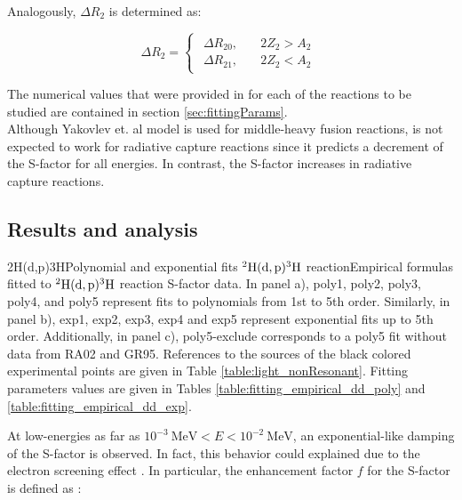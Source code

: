 \documentclass[openany]{book}
\begin{document}
Analogously, $\Delta R_2$ is determined as: 

\begin{equation} \label{eq:potential_Yakovlev_R2}
	\Delta R_2= 	\left\{\begin{array}{l}
		\begin{split}
			\Delta R_{20}, \quad & 2Z_2 > A_2\\ 
			\Delta R_{21}, \quad & 2Z_2 < A_2
		\end{split}
	\end{array}\right.
\end{equation}

The numerical values that were provided in \cite{yakovlev_beard_gasques_wiescher_2010} for each of the reactions to be studied are contained in section \ref{sec:fittingParams}. \\

Although Yakovlev et. al model is used for middle-heavy fusion reactions, is not expected to work for radiative capture reactions since it predicts a decrement of the S-factor for all energies. In contrast, the S-factor increases in radiative capture reactions.  \\


\subsection{Results and analysis} \label{sub:resultsAnalysisNonResonant}

{2H(d,p)3H}{Polynomial and exponential fits $\mathrm{{}^{2}H(d, p){}^{3}H}$ reaction}{Empirical formulas fitted to $\mathrm{{}^{2}H(d, p){}^{3}H}$ reaction S-factor data. In panel a), poly1, poly2, poly3, poly4, and poly5 represent fits to polynomials from 1st to 5th order.  Similarly, in panel b), exp1, exp2, exp3, exp4 and exp5 represent exponential fits up to 5th order. Additionally, in panel c), poly5-exclude corresponds to a poly5 fit without data from RA02 and GR95. References to the sources of the black colored experimental points are given in Table \ref{table:light_nonResonant}. Fitting parameters values are given in Tables \ref{table:fitting_empirical_dd_poly} and \ref{table:fitting_empirical_dd_exp}.}



At low-energies as far as $ \mathrm{10^{-3} \ MeV}  <  E<\mathrm{10^{-2} \ MeV}$, an exponential-like damping of the S-factor is observed. In fact, this  behavior could explained due to the electron screening effect \cite{raiola_migliardi_gyurky_aliotta_formicola_bonetti_broggini_campajola_corvisiero_costantini_et_2002}. In particular, the enhancement factor $f$ for the S-factor is defined as \cite{raiola_migliardi_gyurky_aliotta_formicola_bonetti_broggini_campajola_corvisiero_costantini_et_2002}: 
\end{document}

